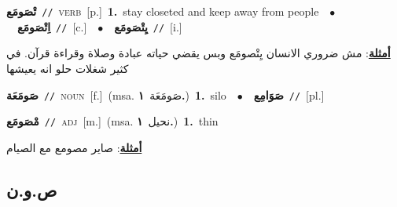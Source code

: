 \documentclass[10pt,a4paper,twoside]{article} %
\begin{document}
\begin{multicols}{2}
{\setlength\topsep{0pt}\textbf{\foreignlanguage{arabic}{تْصَومَع}}\ {\color{gray}\texttt{//}\color{black}}\ \textsc{verb}\ [p.]\ \textbf{1.}~stay closeted and keep away from people\ \ $\bullet$\ \ \setlength\topsep{0pt}\textbf{\foreignlanguage{arabic}{اِتْصَومَع}}\ {\color{gray}\texttt{//}\color{black}}\ [c.]\ \ $\bullet$\ \ \setlength\topsep{0pt}\textbf{\foreignlanguage{arabic}{يِتْصَومَع}}\ {\color{gray}\texttt{//}\color{black}}\ [i.]\  \begin{flushright}\color{gray}\foreignlanguage{arabic}{\textbf{\underline{\foreignlanguage{arabic}{أمثلة}}}: مش ضروري الانسان يِتْصومَع وبس يقضي حياته عبادة وصلاة وقراءة قرآن. في كثير شغلات حلو انه يعيشها}\end{flushright}\color{black}} \vspace{2mm}

{\setlength\topsep{0pt}\textbf{\foreignlanguage{arabic}{صَومَعَة}}\ {\color{gray}\texttt{//}\color{black}}\ \textsc{noun}\ [f.]\ \color{gray}(msa. \foreignlanguage{arabic}{صَومَعَة}~\foreignlanguage{arabic}{\textbf{١.}})\color{black}\ \textbf{1.}~silo\ \ $\bullet$\ \ \setlength\topsep{0pt}\textbf{\foreignlanguage{arabic}{صَوَامِع}}\ {\color{gray}\texttt{//}\color{black}}\ [pl.]\ } \vspace{2mm}

{\setlength\topsep{0pt}\textbf{\foreignlanguage{arabic}{مْصَومَع}}\ {\color{gray}\texttt{//}\color{black}}\ \textsc{adj}\ [m.]\ \color{gray}(msa. \foreignlanguage{arabic}{نحيل}~\foreignlanguage{arabic}{\textbf{١.}})\color{black}\ \textbf{1.}~thin\  \begin{flushright}\color{gray}\foreignlanguage{arabic}{\textbf{\underline{\foreignlanguage{arabic}{أمثلة}}}: صاير مصومع مع الصيام}\end{flushright}\color{black}} \vspace{2mm}

\vspace{-3mm}
\subsection*{\color{blue}\foreignlanguage{arabic}{ص.و.ن}\color{blue}{}} 


\end{multicols}
\end{document}
